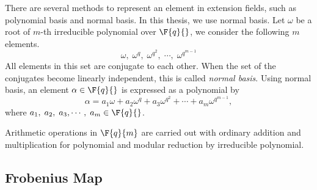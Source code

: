 
There are several methods to represent an element in extension fields, such as polynomial basis and normal basis.
In this thesis, we use normal basis.
Let $\omega$ be a root of $m$-th irreducible polynomial over $\F{q}{}$, we consider the following $m$ elements.
\begin{equation}
\omega,\;\omega^q,\;\omega^{q^2},\;\cdots,\;\omega^{q^{m-1}} \nonumber
\end{equation}
All elements in this set are conjugate to each other.
When the set of the conjugates become linearly independent, this is called {\it normal basis}.
Using normal basis, an element $\alpha \in \F{q}{}$ is expressed as a polynomial by  
\begin{equation}
\alpha = a_1 \omega + a_2 \omega^q + a_3 \omega^{q^2} + \cdots + a_m \omega^{q^{m-1}}, 
\end{equation}
where $a_1,\;a_2,\;a_3,\cdots,\;a_m \in \F{q}{}$.

Arithmetic operations in $\F{q}{m}$ are carried out with ordinary addition and multiplication for polynomial and modular reduction by irreducible polynomial.





\subsection{Frobenius Map}\label{secFrob}

